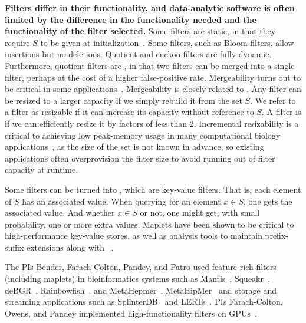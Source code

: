 \noindent
\textbf{Filters differ in their functionality, and data-analytic software is often limited by the difference in the functionality needed and the functionality of the filter selected.}
Some filters are static, in that they require $S$ to be given at initialization~\cite{GrafLe20,DillingerW21}.  Some filters, such as Bloom filters, allow insertions but no deletions.  Quotient and cuckoo filters are fully dynamic.  Furthermore, quotient filters are , in that two filters can be merged into a single filter, perhaps at the cost of a higher false-positive rate.  Mergeability turns out to be critical in some applications~\cite{conway2020splinterdb,PandeyAlBe18}. Mergeability is closely related to .  Any filter can be resized to a larger capacity if we  simply rebuild it from the set $S$.  We refer to a filter as resizable if it can increase its capacity without reference to $S$.  A filter is  if we can efficiently resize it by factors of less than 2.  Incremental resizability is a critical to achieving low peak-memory usage in many computational biology applications~\cite{hofmeyr2020terabase,PandeyBJP17,MarccaisKi11,wood2014kraken,wood2019improved}, as the size of the set is not known in advance, so existing applications often overprovision the filter size to avoid running out of filter capacity at runtime.



Some filters can be turned into , which are key-value filters.  That is, each element of $S$ has an associated value.  When querying for an element $x\in S$, one gets the associated value.  And whether $x\in S$ or not, one might get, with small probability, one or more extra values.  Maplets have been shown to be  critical to high-performance key-value stores, as well as \kmer analysis tools to maintain prefix-suffix extensions along with \kmers~\cite{GeorganasEHG18}. 

The PIs Bender, Farach-Colton, Pandey, and Patro used feature-rich filters (including maplets) in bioinformatics systems such as Mantis~\cite{PandeyAlBe18}, Squeakr~\cite{PandeyBeJo18}, deBGR~\cite{PandeyBeJo17b}, Rainbowfish~\cite{almodaresi2017rainbowfish}, and MetaHepmer~\cite{mccoy2022high}, MetaHipMer~\cite{McCoyHYP23a} and storage and streaming applications such as SplinterDB~\cite{conway2020splinterdb} and LERTs~\cite{pandey2020timely}.
PIs Farach-Colton, Owens, and Pandey implemented high-functionality filters on GPUs~\cite{mccoy2022high, McCoyHYP23a, GeilFO18}. 

